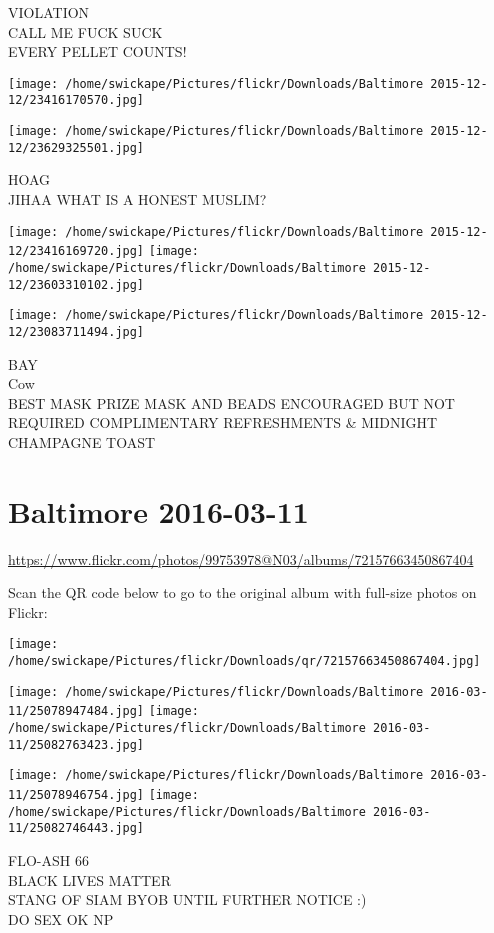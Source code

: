 \documentclass[10pt,letterpaper]{article}
\begin{document}
VIOLATION\\
CALL ME FUCK SUCK\\
EVERY PELLET COUNTS!
\pagebreak

\texttt{[image: /home/swickape/Pictures/flickr/Downloads/Baltimore 2015-12-12/23416170570.jpg]}

\vspace{0.25in}
\texttt{[image: /home/swickape/Pictures/flickr/Downloads/Baltimore 2015-12-12/23629325501.jpg]}

HOAG\\
JIHAA WHAT IS A HONEST MUSLIM?
\pagebreak

\texttt{[image: /home/swickape/Pictures/flickr/Downloads/Baltimore 2015-12-12/23416169720.jpg]}
\texttt{[image: /home/swickape/Pictures/flickr/Downloads/Baltimore 2015-12-12/23603310102.jpg]}

\texttt{[image: /home/swickape/Pictures/flickr/Downloads/Baltimore 2015-12-12/23083711494.jpg]}

BAY\\
Cow\\
BEST MASK PRIZE MASK AND BEADS ENCOURAGED BUT NOT REQUIRED COMPLIMENTARY REFRESHMENTS \& MIDNIGHT CHAMPAGNE TOAST
\pagebreak

\section*{Baltimore 2016-03-11}

\url{https://www.flickr.com/photos/99753978@N03/albums/72157663450867404}

Scan the QR code below to go to the original album with full-size photos on Flickr:

\texttt{[image: /home/swickape/Pictures/flickr/Downloads/qr/72157663450867404.jpg]}
\pagebreak

\texttt{[image: /home/swickape/Pictures/flickr/Downloads/Baltimore 2016-03-11/25078947484.jpg]}
\texttt{[image: /home/swickape/Pictures/flickr/Downloads/Baltimore 2016-03-11/25082763423.jpg]}

\texttt{[image: /home/swickape/Pictures/flickr/Downloads/Baltimore 2016-03-11/25078946754.jpg]}
\texttt{[image: /home/swickape/Pictures/flickr/Downloads/Baltimore 2016-03-11/25082746443.jpg]}

FLO{-}ASH 66\\
BLACK LIVES MATTER\\
STANG OF SIAM BYOB UNTIL FURTHER NOTICE :)\\
DO SEX OK NP
\pagebreak
\end{document}
